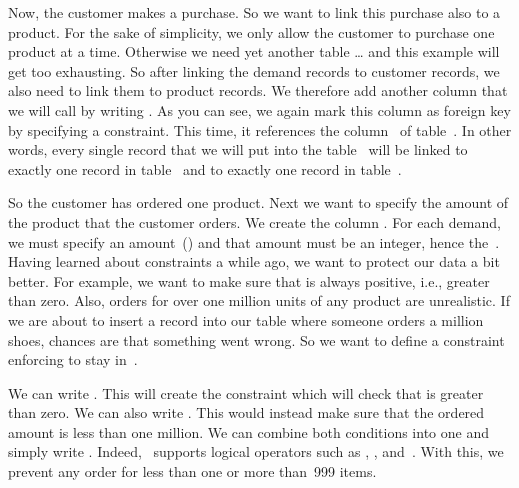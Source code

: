 Now, the customer makes a purchase.
So we want to link this purchase also to a product.
For the sake of simplicity, we only allow the customer to purchase one product at a time.
Otherwise we need yet another table {\dots} and this example will get too exhausting.
So after linking the demand records to customer records, we also need to link them to product records.
We therefore add another column that we will call  by writing .
As you can see, we again mark this column as foreign key by specifying a  constraint.
This time, it references the column~ of table~.
In other words, every single record that we will put into the table~ will be linked to exactly one record in table~ and to exactly one record in table~.

So the customer has ordered one product.
Next we want to specify the amount of the product that the customer orders.
We create the column .
For each demand, we must specify an amount~() and that amount must be an integer, hence the~.
Having learned about constraints a while ago, we want to protect our data a bit better.
For example, we want to make sure that  is always positive, i.e., greater than zero.
Also, orders for over one million units of any product are unrealistic.
If we are about to insert a record into our  table where someone orders a million shoes, chances are that something went wrong.
So we want to define a constraint enforcing  to stay in~.

We can write .
This will create the constraint  which will check that  is greater than zero.
We can also write .
This would instead make sure that the ordered amount is less than one million.
We can combine both conditions into one and simply write .
Indeed, \sql\ supports logical operators such as , , and~.
With this, we prevent any order for less than one or more than~999 items.

